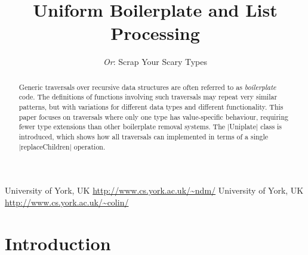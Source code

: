\documentclass[preprint]{sigplanconf}
\newenvironment{code}{\begin{alltt}\small}{\end{alltt}}
\begin{document}
\copyrightdata{[to be supplied]}

\titlebanner{\today{} - \currenttime{}}        %
\preprintfooter{}   %

\title{Uniform Boilerplate and List Processing}
\subtitle{\textit{Or}: Scrap Your Scary Types}

           {University of York, UK}
           {\url{http://www.cs.york.ac.uk/~ndm/}}
           {University of York, UK}
           {\url{http://www.cs.york.ac.uk/~colin/}}

\maketitle

\begin{abstract}
Generic traversals over recursive data structures are often referred to as \textit{boilerplate} code. The definitions of functions involving such traversals may repeat very similar patterns, but with variations for different data types and different functionality. This paper focuses on traversals where only one type has value-specific behaviour, requiring fewer type extensions than other boilerplate removal systems. The |Uniplate| class is introduced, which shows how all traversals can implemented in terms of a single |replaceChildren| operation.
\end{abstract}

\section{Introduction}
\end{document}
